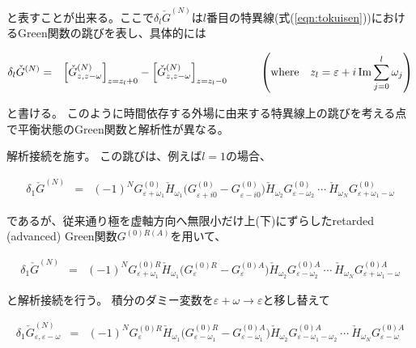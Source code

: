 \documentclass[uplatex,a4j,12pt,dvipdfmx]{jsarticle}
\begin{document}
と表すことが出来る。ここで$\delta_{l} \check{G}^{(N)}$は$l$番目の特異線(式(\ref{eqn:tokuisen}))におけるGreen関数の跳びを表し、具体的には

\begin{eqnarray}
	\delta_{l} \check{G}^{(N)}
	&=&
	\Big[ \check{G}^{(N)}_{z,z - \omega} \Big]_{z = z_{l} + 0}
	-
	\Big[ \check{G}^{(N)}_{z,z - \omega} \Big]_{z = z_{l} - 0}
	\hspace{10mm}
	\left( {\rm where} \ \ \ z_{l} = \varepsilon + i \ \! {\rm Im} \sum^{l}_{j=0} \omega_{j} \right)
\end{eqnarray}

と書ける。
このように時間依存する外場に由来する特異線上の跳びを考える点で平衡状態のGreen関数と解析性が異なる。






解析接続を施す。
この跳びは、例えば$l=1$の場合、

\begin{eqnarray}
	\delta_{1} \check{G}^{(N)}
	&=&
	(-1)^{N}
	G^{(0)}_{\varepsilon + \omega_{1} }
	\check{H}_{\omega_{1}}
	\Big( G^{(0)}_{\varepsilon + i 0 } - G^{(0)}_{\varepsilon - i 0 } \Big)
	\check{H}_{\omega_{2}}
	G^{(0)}_{\varepsilon - \omega_{2} }
	\ \cdots \
	\check{H}_{\omega_{N}}
	G^{(0)}_{\varepsilon + \omega_{1} - \omega }
\end{eqnarray}

であるが、従来通り極を虚軸方向へ無限小だけ上(下)にずらしたretarded (advanced) Green関数$G^{(0) R(A)}$を用いて、

\begin{eqnarray}
	\delta_{1} \check{G}^{(N)}
	&=&
	(-1)^{N}
	G^{(0)R}_{\varepsilon + \omega_{1} }
	\check{H}_{\omega_{1}}
	\Big( G^{(0)R}_{\varepsilon} - G^{(0)A}_{\varepsilon} \Big)
	\check{H}_{\omega_{2}}
	G^{(0)A}_{\varepsilon - \omega_{2} }
	\ \cdots \
	\check{H}_{\omega_{N}}
	G^{(0)A}_{\varepsilon + \omega_{1} - \omega }
\end{eqnarray}

と解析接続を行う。
積分のダミー変数を$\varepsilon + \omega \to \varepsilon$と移し替えて

\begin{eqnarray}
	\delta_{1} \check{G}^{(N)}_{\varepsilon , \varepsilon - \omega}
	&=&
	(-1)^{N}
	G^{(0)R}_{\varepsilon }
	\check{H}_{\omega_{1}}
	\Big( G^{(0)R}_{\varepsilon - \omega_{1}} - G^{(0)A}_{\varepsilon - \omega_{1}} \Big)
	\check{H}_{\omega_{2}}
	G^{(0)A}_{\varepsilon - \omega_{1} - \omega_{2} }
	\ \cdots \
	\check{H}_{\omega_{N}}
	G^{(0)A}_{\varepsilon - \omega }
\end{eqnarray}
\end{document}

